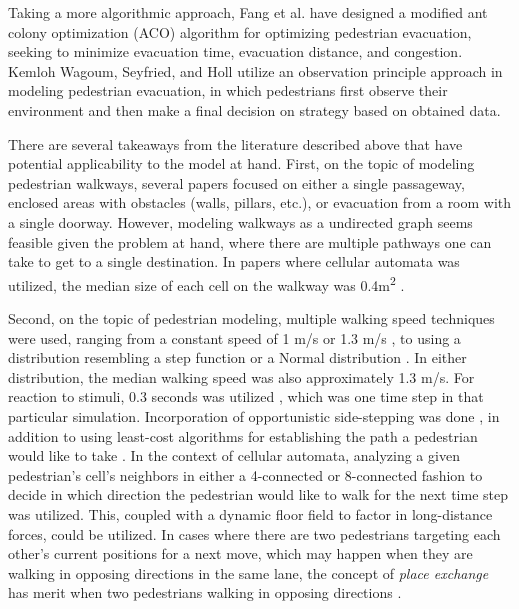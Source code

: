 \documentclass[12pt]{article}
\begin{document}
Taking a more algorithmic approach, Fang et al. \cite{fang2011hierarchical} have
designed a modified ant colony optimization (ACO) algorithm for optimizing
pedestrian evacuation, seeking to minimize evacuation time, evacuation distance,
and congestion. Kemloh Wagoum, Seyfried, and Holl \cite{kemloh2012modeling}
utilize an observation principle approach in modeling pedestrian evacuation,
in which pedestrians first observe their environment and then make a final
decision on strategy based on obtained data.

There are several takeaways from the literature described above that have
potential applicability to the model at hand. First, on the topic of modeling
pedestrian walkways, several papers focused on either a single passageway,
enclosed areas with obstacles (walls, pillars, etc.), or evacuation from a
room with a single doorway. However, modeling walkways as a undirected graph
\cite{fang2011hierarchical} seems feasible given the problem at hand, where
there are multiple pathways one can take to get to a single destination. In
papers where cellular automata was utilized, the median size of each cell on the
walkway was 0.4m\textsuperscript{2}
\cite{blue2001cellular,burstedde2001simulation,weifeng2003simulation}.

Second, on the topic of pedestrian modeling, multiple walking speed techniques
were used, ranging from a constant speed of 1 m/s \cite{weifeng2003simulation}
or 1.3 m/s \cite{burstedde2001simulation}, to using a distribution resembling a
step function \cite{blue2001cellular} or a Normal distribution
\cite{klupfel2005models}. In either distribution, the median walking speed was
also approximately 1.3 m/s. For reaction to stimuli, 0.3 seconds was utilized
\cite{burstedde2001simulation}, which was one time step in that particular
simulation. Incorporation of opportunistic side-stepping was done
\cite{blue2001cellular}, in addition to using least-cost algorithms for
establishing the path a pedestrian would like to take
\cite{fang2011hierarchical}. In the context of cellular automata, analyzing a
given pedestrian's cell's neighbors in either a 4-connected
\cite{weifeng2003simulation} or 8-connected fashion
\cite{burstedde2001simulation} to decide in which direction the pedestrian would
like to walk for the next time step was utilized. This, coupled with a dynamic
floor field \cite{burstedde2001simulation} to factor in long-distance forces,
could be utilized. In cases where there are two pedestrians targeting each other's
current positions for a next move, which may happen when they are walking in
opposing directions in the same lane, the concept of \textit{place exchange}
has merit when two pedestrians walking in opposing directions \cite{blue2001cellular}.
\end{document}
